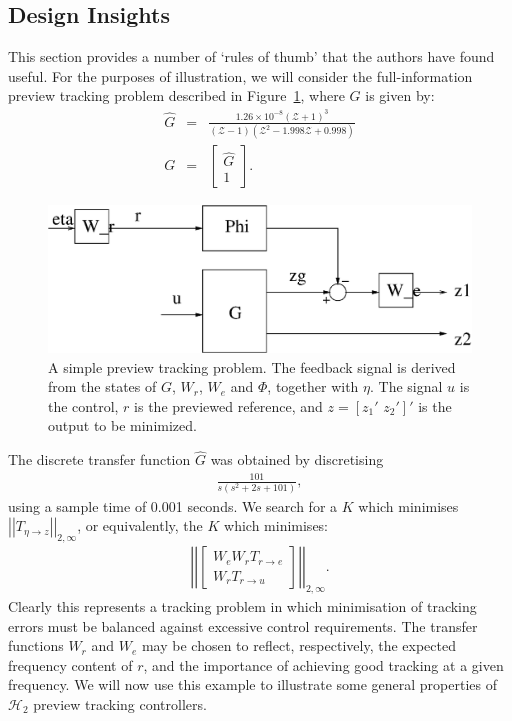\documentclass[a4paper,12pt]{article}
\theoremstyle{remark}
\newcommand{\nrm}[1]{\left|\left| #1 \right|\right|}
\newcommand{\ma}[1]{\begin{bmatrix} #1 \end{bmatrix}}
\newcommand{\als}[1]{\begin{align*} #1 \end{align*}}
\newcommand{\aln}[1]{\begin{align} #1 \end{align}}
\newcommand{\htwo}{\mathcal H_2}
\newcommand{\rf}[1]{{\mathbf{#1}}}
\newcommand{\W}{{\rf{ W}} }
\newcommand{\z}{\cal{Z}}
\renewcommand{\z}{\mathcal{Z}}
\begin{document}
\subsection{Design Insights}
This section provides a number of `rules of thumb' that the authors have found useful. For the purposes of illustration, we will consider the full-information preview tracking problem described in Figure~\ref{fig:PrevTrackSysFI}, where $G$ is given by:
\begin{eqnarray}
\hat G&=&\frac{1.26 \times 10^{-8} (\z+1)^3}{
		(\z-1) (\z^2  - 1.998\z + 0.998)} \nonumber \\
G&=&\ma{\hat G\\1}. \label{example}
\end{eqnarray}
\begin{figure}
\begin{center}
\includegraphics[width=0.75\columnwidth]{./Fig_8.eps}
\end{center}
\caption{A simple preview tracking problem. The feedback signal is derived from the states of $G$, $W_r$, $W_e$ and $\Phi$, together with $\eta$. The signal $u$ is the control, $r$ is the previewed reference, and $z=\left[z_1'\,\,z_2'\right]'$ is the output to be minimized. \label{fig:PrevTrackSysFI}}
\end{figure}
The discrete transfer function $\hat G$ was obtained by discretising
\als{       \frac{101}{s (s^2 + 2s + 101)},}
using a sample time of 0.001 seconds.
We search for a $K$ which minimises $\nrm{T_{\eta\rightarrow z}}_{2,\infty}$, or equivalently, the $K$ which minimises:
\aln{
\nrm{\ma{W_eW_rT_{r\rightarrow e}\\W_rT_{r\rightarrow u}}}_{2,\infty} \label{eqn:DesInsightCL}
.}
Clearly this represents a tracking problem in which minimisation of tracking errors must be balanced against  excessive control requirements. The transfer functions $W_r$ and $W_e$ may be chosen to reflect, respectively, the expected frequency content of $r$, and the importance of achieving good tracking at a given frequency. We will now use this example to illustrate some general properties of $\htwo$ preview tracking controllers.
\end{document}
